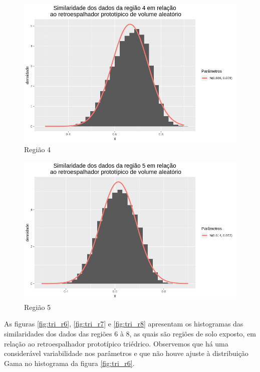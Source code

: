 \documentclass[12pt]{article}
\begin{document}
\begin{figure}[!h]
    \centering    
    \vspace{0.1\linewidth}
    \includegraphics[width = 0.95\linewidth]{../../Images/Report_18_12_17/rv_region4.png}
    \caption{Região 4}
    \label{fig:rv_r4}
\end{figure}

\begin{figure}[!h]
    \centering    
    \vspace{0.1\linewidth}
    \includegraphics[width = 0.95\linewidth]{../../Images/Report_18_12_17/rv_region5.png}
    \caption{Região 5}
    \label{fig:rv_r5}
\end{figure}

\newpage

As figuras \ref{fig:tri_r6}, \ref{fig:tri_r7} e \ref{fig:tri_r8} apresentam os histogramas das similaridades dos dados das regiões 6 à 8, as quais são regiões de solo exposto, em relação ao retroespalhador prototípico triédrico. Observemos que há uma considerável variabilidade nos parâmetros e que não houve ajuste à distribuição Gama no histograma da figura \ref{fig:tri_r6}. 
\end{document}
